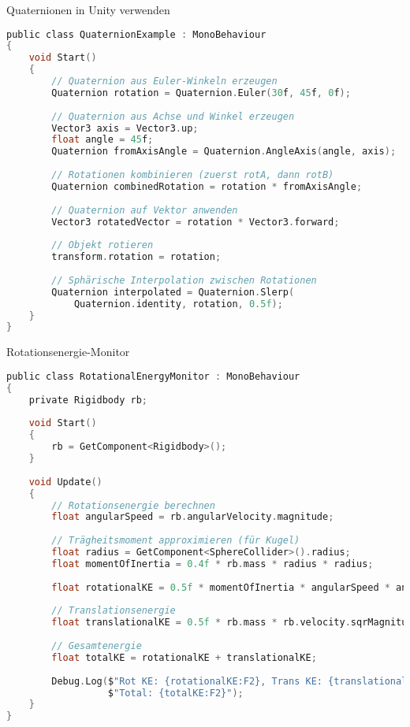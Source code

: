\begin{code}{Quaternionen in Unity verwenden}\\
\begin{lstlisting}[language=C, style=basesmol]
public class QuaternionExample : MonoBehaviour 
{
    void Start() 
    {
        // Quaternion aus Euler-Winkeln erzeugen
        Quaternion rotation = Quaternion.Euler(30f, 45f, 0f);
        
        // Quaternion aus Achse und Winkel erzeugen
        Vector3 axis = Vector3.up;
        float angle = 45f;
        Quaternion fromAxisAngle = Quaternion.AngleAxis(angle, axis);
        
        // Rotationen kombinieren (zuerst rotA, dann rotB)
        Quaternion combinedRotation = rotation * fromAxisAngle;
        
        // Quaternion auf Vektor anwenden
        Vector3 rotatedVector = rotation * Vector3.forward;
        
        // Objekt rotieren
        transform.rotation = rotation;
        
        // Sphärische Interpolation zwischen Rotationen
        Quaternion interpolated = Quaternion.Slerp(
            Quaternion.identity, rotation, 0.5f);
    }
}
\end{lstlisting}
\end{code}

\begin{code}{Rotationsenergie-Monitor}\\
\begin{lstlisting}[language=C, style=basesmol]
public class RotationalEnergyMonitor : MonoBehaviour 
{
    private Rigidbody rb;
    
    void Start() 
    {
        rb = GetComponent<Rigidbody>();
    }
    
    void Update() 
    {
        // Rotationsenergie berechnen
        float angularSpeed = rb.angularVelocity.magnitude;
        
        // Trägheitsmoment approximieren (für Kugel)
        float radius = GetComponent<SphereCollider>().radius;
        float momentOfInertia = 0.4f * rb.mass * radius * radius;
        
        float rotationalKE = 0.5f * momentOfInertia * angularSpeed * angularSpeed;
        
        // Translationsenergie
        float translationalKE = 0.5f * rb.mass * rb.velocity.sqrMagnitude;
        
        // Gesamtenergie
        float totalKE = rotationalKE + translationalKE;
        
        Debug.Log($"Rot KE: {rotationalKE:F2}, Trans KE: {translationalKE:F2}, " +
                  $"Total: {totalKE:F2}");
    }
}
\end{lstlisting}
\end{code}

